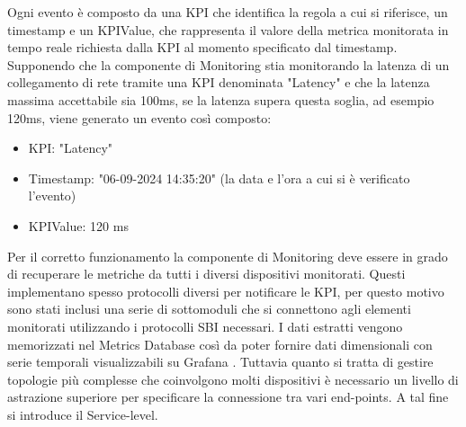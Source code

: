 Ogni evento è composto da una KPI che identifica la regola a cui si riferisce, un timestamp e un KPIValue, che rappresenta il valore della metrica monitorata in tempo reale richiesta dalla KPI al momento specificato dal timestamp.
Supponendo che la componente di Monitoring stia monitorando la latenza di un collegamento di rete tramite una KPI denominata "Latency" e che la latenza massima accettabile sia 100ms,
se la latenza supera questa soglia, ad esempio 120ms, viene generato un evento così composto: 
\begin{itemize}
    \item KPI: "Latency"
    \item Timestamp: "06-09-2024 14:35:20" (la data e l'ora a cui si è verificato l'evento)
    \item KPIValue: 120 ms
\end{itemize}
Per il corretto funzionamento la componente di Monitoring deve essere in grado di recuperare le metriche da tutti i diversi dispositivi monitorati.
Questi implementano spesso protocolli diversi per notificare le KPI, per questo motivo sono stati inclusi una serie di sottomoduli che si connettono 
agli elementi monitorati utilizzando i protocolli SBI necessari. I dati estratti vengono memorizzati nel Metrics Database così da poter fornire dati dimensionali 
con serie temporali visualizzabili su Grafana \cite{grafana}.
Tuttavia quanto si tratta di gestire topologie più complesse che coinvolgono molti dispositivi è necessario un livello di astrazione superiore per specificare la connessione tra vari end-points. A tal fine si introduce il Service-level. 

